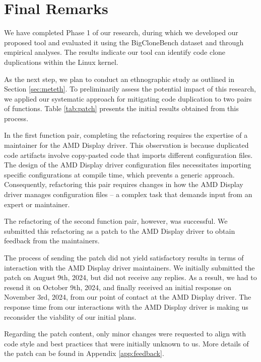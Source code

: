 \en

\section{Final Remarks}

We have completed Phase 1 of our research, during which we developed our proposed tool and evaluated it using the BigCloneBench dataset and through empirical analyses. The results indicate our tool can identify code clone duplications within the Linux kernel.

As the next step, we plan to conduct an ethnographic study as outlined in Section \ref{sec:meteth}. To preliminarily assess the potential impact of this research, we applied our systematic approach for mitigating code duplication to two pairs of functions. Table \ref{tab:patch} presents the initial results obtained from this process.



In the first function pair, completing the refactoring requires the expertise of a maintainer for the AMD Display driver. This observation is because duplicated code artifacts involve copy-pasted code that imports different configuration files. The design of the AMD Display driver configuration files necessitates importing specific configurations at compile time, which prevents a generic approach. Consequently, refactoring this pair requires changes in how the AMD Display driver manages configuration files -- a complex task that demands input from an expert or maintainer.

The refactoring of the second function pair, however, was successful. 
We submitted this refactoring as a patch to the AMD Display driver to obtain feedback 
from the maintainers. 

The process of sending the patch did not yield satisfactory results in terms of 
interaction with the AMD Display driver maintainers. We initially submitted the 
patch on August 9th, 2024, but did not receive any replies. As a result, we had 
to resend it on October 9th, 2024, and finally received an initial response on 
November 3rd, 2024, from our point of contact at the AMD Display driver. 
The response time from our interactions with the AMD Display driver is making 
us reconsider the viability of our initial plans.

Regarding the patch content, only minor changes were requested to align with code 
style and best practices that were initially unknown to us. More details of the 
patch can be found in Appendix \ref{app:feedback}.


